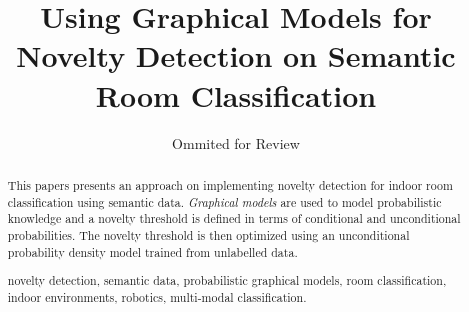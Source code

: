 \documentclass[runningheads,a4paper]{llncs}
\newcommand{\keywords}[1]{\par\addvspace\baselineskip
\noindent\keywordname\enspace\ignorespaces#1}
\begin{document}
\mainmatter  %

\title{Using Graphical Models for Novelty Detection on Semantic Room Classification}


%
%
\author{Ommited for Review}
%


\maketitle


\begin{abstract}
This papers presents an approach on implementing novelty detection for indoor room classification
using semantic data.
\emph{Graphical models} are used to model probabilistic knowledge and a novelty threshold is
defined in terms of conditional and unconditional probabilities.
The novelty threshold is then optimized using an unconditional probability density
model trained from unlabelled data.


\keywords{novelty detection, semantic data, probabilistic graphical models,
room classification, indoor environments, robotics, multi-modal classification.}
\end{abstract}
\end{document}
